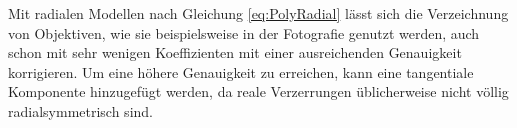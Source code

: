 Mit radialen Modellen nach Gleichung \ref{eq:PolyRadial} lässt sich die Verzeichnung von Objektiven, wie sie beispielsweise in der Fotografie genutzt werden, auch schon mit sehr wenigen Koeffizienten mit einer ausreichenden Genauigkeit korrigieren. Um eine höhere Genauigkeit zu erreichen, kann eine tangentiale Komponente hinzugefügt werden, da reale Verzerrungen üblicherweise nicht völlig radialsymmetrisch sind.